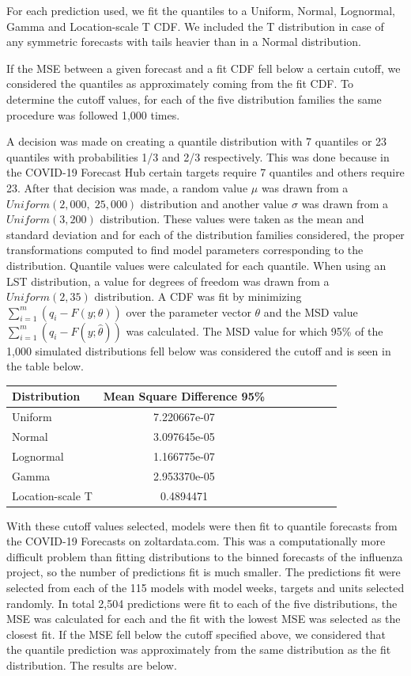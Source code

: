 \documentclass{article}\usepackage[]{graphicx}\usepackage[]{color}
\begin{document}
For each prediction used, we fit the quantiles to a Uniform, Normal, Lognormal,
Gamma and Location-scale T CDF. We included the T distribution in case of any
symmetric forecasts with tails heavier than in a Normal distribution.

If the MSE between a given forecast and a fit CDF fell below a certain cutoff,
we considered the quantiles as approximately coming from the fit CDF. To
determine the cutoff values, for each of the five distribution families the same
procedure was followed 1,000 times. 

A decision was made on creating a quantile distribution with 7 quantiles or 23
quantiles with probabilities 1/3 and 2/3 respectively. This was done because 
in the COVID-19 Forecast Hub certain targets require 7 quantiles and others 
require 23. After that decision was made, a random value $\mu$ was drawn from
a $Uniform(2,000,\; 25,000)$ distribution and another value $\sigma$ was drawn
from a $Uniform(3, 200)$ distribution. These values were taken as the mean and
standard deviation and for each of the distribution families considered, the
proper transformations computed to find model parameters corresponding to the 
distribution. Quantile values were calculated for each quantile. When using an 
LST distribution, a value for degrees of freedom was drawn from a 
$Uniform(2,35)$ distribution. A CDF
was fit by minimizing $\sum_{i=1}^m (q_i - F(y; \theta))$ over the parameter
vector $\theta$ and the MSD value $\sum_{i=1}^m (q_i - F(y; \hat{\theta}))$ was 
calculated. The MSD value for which 95\% of the 1,000 simulated distributions
fell below was considered the cutoff and is seen in the table below.

\begin{table}[h!]
  \centering
  \begin{tabular}{l*{6}{c}r}
  Distribution          & Mean Square Difference 95\%  \\
  \hline
  Uniform               & 7.220667e-07   \\
  Normal                & 3.097645e-05  \\
  Lognormal             & 1.166775e-07  \\
  Gamma                 & 2.953370e-05  \\
  Location-scale T      & 0.4894471 \\
  \end{tabular}
\end{table}


With these cutoff values selected, models were then fit to quantile forecasts
from the COVID-19 Forecasts on zoltardata.com. This was a computationally more
difficult problem than fitting distributions to the binned forecasts of the 
influenza project, so the number of predictions fit is much smaller. The 
predictions fit were selected from each of the 115 models with model weeks, 
targets and units selected randomly. In total 2,504 predictions were fit to each
of the five distributions, the MSE was calculated for each and the fit with the
lowest MSE was selected as the closest fit. If the MSE fell below the cutoff
specified above, we considered that the quantile prediction was approximately
from the same distribution as the fit distribution. The results are below.
\end{document}
